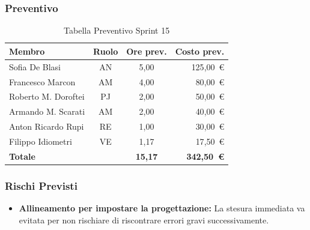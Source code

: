 \subsubsection{Preventivo}
\begin{table}[H]
    \centering
    \renewcommand{\arraystretch}{1.3}
    \begin{tabularx}{\textwidth}{|X|c|c|r|}
        \hline
        \textbf{Membro} & \textbf{Ruolo} & \textbf{Ore prev.} & \textbf{Costo prev.} \\
        \hline
        Sofia De Blasi       & AN & 5,00 & 125{,}00~\euro \\
        Francesco Marcon     & AM & 4,00 & 80{,}00~\euro \\
        Roberto M. Doroftei  & PJ & 2,00 & 50{,}00~\euro \\
        Armando M. Scarati   & AM & 2,00 & 40{,}00~\euro \\
        Anton Ricardo Rupi   & RE & 1,00 & 30{,}00~\euro \\
        Filippo Idiometri    & VE & 1,17 & 17{,}50~\euro \\
        \hline
        \textbf{Totale}      &    & \textbf{15,17} & \textbf{342,50~\euro} \\
        \hline
    \end{tabularx}
    \caption{Tabella Preventivo Sprint 15} 
\end{table}

\subsubsection{Rischi Previsti}
\begin{itemize}
    \item \textbf{Allineamento per impostare la progettazione:} La stesura immediata va evitata per non rischiare di riscontrare errori gravi successivamente.
\end{itemize}


